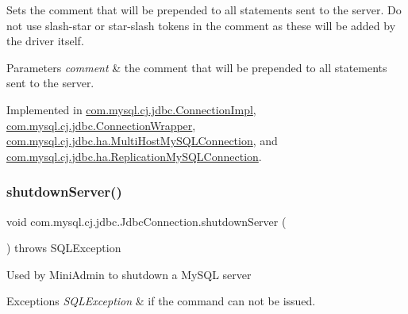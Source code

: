 Sets the comment that will be prepended to all statements sent to the server. Do not use slash-\/star or star-\/slash tokens in the comment as these will be added by the driver itself.


\begin{DoxyParams}{Parameters}
{\em comment} & the comment that will be prepended to all statements sent to the server. \\
\hline
\end{DoxyParams}


Implemented in \mbox{\hyperlink{classcom_1_1mysql_1_1cj_1_1jdbc_1_1_connection_impl_ae62d28e9ed05949b66aa0ea00633d51d}{com.\+mysql.\+cj.\+jdbc.\+Connection\+Impl}}, \mbox{\hyperlink{classcom_1_1mysql_1_1cj_1_1jdbc_1_1_connection_wrapper_a79c9fe73cc7069028015a7e3e6a383fb}{com.\+mysql.\+cj.\+jdbc.\+Connection\+Wrapper}}, \mbox{\hyperlink{classcom_1_1mysql_1_1cj_1_1jdbc_1_1ha_1_1_multi_host_my_s_q_l_connection_a4e028eb0c700613a20c0a2b7f8a21170}{com.\+mysql.\+cj.\+jdbc.\+ha.\+Multi\+Host\+My\+S\+Q\+L\+Connection}}, and \mbox{\hyperlink{classcom_1_1mysql_1_1cj_1_1jdbc_1_1ha_1_1_replication_my_s_q_l_connection_a7afc9e0c6196c0acd9f60ca99c5e7b8a}{com.\+mysql.\+cj.\+jdbc.\+ha.\+Replication\+My\+S\+Q\+L\+Connection}}.

\mbox{\label{interfacecom_1_1mysql_1_1cj_1_1jdbc_1_1_jdbc_connection_ad9bedf228ed2ec194197ac2ceb960a94}} 
\subsubsection{\texorpdfstring{shutdown\+Server()}{shutdownServer()}}
{\footnotesize\ttfamily void com.\+mysql.\+cj.\+jdbc.\+Jdbc\+Connection.\+shutdown\+Server (\begin{DoxyParamCaption}{ }\end{DoxyParamCaption}) throws S\+Q\+L\+Exception}

Used by Mini\+Admin to shutdown a My\+S\+QL server


\begin{DoxyExceptions}{Exceptions}
{\em S\+Q\+L\+Exception} & if the command can not be issued. \\
\hline
\end{DoxyExceptions}


